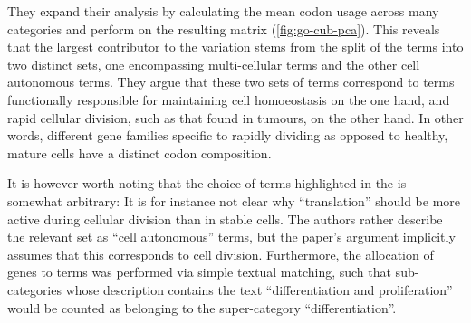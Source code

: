 They expand their analysis by calculating the mean codon usage across many \go
categories and perform \pca on the resulting matrix (\cref{fig:go-cub-pca}).
This reveals that the largest contributor to the variation stems from the split
of the \go terms into two distinct sets, one encompassing multi-cellular \go
terms and the other cell autonomous \go terms. They argue that these two sets of
\go terms correspond to \go terms functionally responsible for maintaining cell
homoeostasis on the one hand, and rapid cellular division, such as that found in
tumours, on the other hand. In other words, different gene families specific to
rapidly dividing as opposed to healthy, mature cells have a distinct codon
composition.

It is however worth noting that the choice of \go terms highlighted in the \pca
is somewhat arbitrary: It is for instance not clear why “translation” should be
more active during cellular division than in stable cells. The authors rather
describe the relevant set as “cell autonomous” \go terms, but the paper’s
argument implicitly assumes that this corresponds to cell division. Furthermore,
the allocation of genes to \go terms was performed via simple textual matching,
such that \go sub-categories whose description contains the text
“differentiation and proliferation” would be counted as belonging to the \go
super-category “differentiation”.

